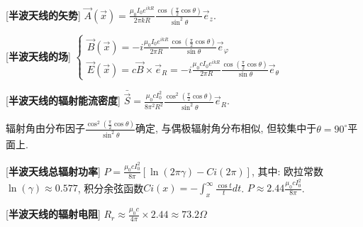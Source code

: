 [\textbf{半波天线的矢势}] $\vec A(\vec x)=\frac{\mu_0I_0e^{ikR}}{2\pi kR}\frac{\cos{\left(\frac{\pi}{2}\cos\theta\right)}}{\sin^2\theta}\vec e_z$.\par

[\textbf{半波天线的场}] $\begin{cases}\vec B(\vec x)=-i\frac{\mu_0I_0e^{ikR}}{2\pi R}\frac{\cos{\left(\frac{\pi}{2}\cos\theta\right)}}{\sin\theta}\vec e_\varphi\\\vec E(\vec x)=c\vec B\times\vec e_R=-i\frac{\mu_0cI_0e^{ikR}}{2\pi R}\frac{\cos{\left(\frac{\pi}{2}\cos\theta\right)}}{\sin\theta}\vec e_\theta \end{cases}$

[\textbf{半波天线的辐射能流密度}] $\bar{\vec S}=\frac{\mu_0cI_0^2}{8\pi^2R^2}\frac{\cos^2{\left(\frac{\pi}{2}\cos\theta\right)}}{\sin^2\theta}\vec e_R$.\par
\qquad 辐射角由分布因子$\frac{\cos^2{\left(\frac{\pi}{2}\cos\theta\right)}}{\sin^2\theta}$确定, 与偶极辐射角分布相似, 但较集中于$\theta=90^\circ$平面上.\par

[\textbf{半波天线总辐射功率}] $P=\frac{\mu_0cI_0^2}{8\pi}[\ln(2\pi\gamma)-Ci(2\pi)]$, 其中: 欧拉常数$\ln(\gamma)\approx 0.577$, 积分余弦函数$Ci(x)=-\int_x^\infty \frac{\cos t}{t}dt$.
\qquad $P\approx 2.44\frac{\mu_0cI_0^2}{8\pi}$.\par

[\textbf{半波天线的辐射电阻}] $R_r\approx\frac{\mu_0c}{4\pi}\times 2.44\approx 73.2\Omega$


